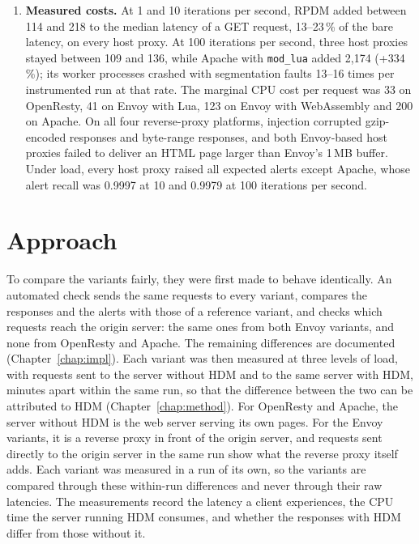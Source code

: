 \documentclass{rptuma}
\begin{document}
\begin{enumerate}
    replicates are taken at 1, 10 and 100 iterations per second (one iteration being nine
    requests), and the probe order follows a Williams design \cite{williams1949designs}. Every
    run is measured on three planes: end-to-end latency from the load generator, CPU time per
    request from the container's control group, and microsecond timers inside the host proxy. Runs
    that fail explicit validity gates are excluded. Separate experiments measure capacity and
    check functional correctness against the bare tier.
  \item \textbf{Measured costs.} At 1 and 10 iterations per second, RPDM added between 114 and
    218\us{} to the median latency of a GET request, 13--23\,\% of the bare latency, on every
    host proxy. At 100 iterations per second, three host proxies stayed between 109 and 136\us, while
    Apache with \texttt{mod\_lua} added 2,174\us{} (+334\,\%); its worker processes crashed with
    segmentation faults 13--16 times per instrumented run at that rate. The marginal CPU cost per
    request was 33\us{} on OpenResty, 41\us{} on Envoy with Lua, 123\us{} on Envoy with
    WebAssembly and 200\us{} on Apache. On all four reverse-proxy platforms, injection corrupted gzip-encoded
    responses and byte-range responses, and both Envoy-based host proxies failed to deliver an HTML page
    larger than Envoy's 1\,MB buffer. Under load, every host proxy raised all expected alerts except
    Apache, whose alert recall was 0.9997 at 10 and 0.9979 at 100 iterations per second.
\end{enumerate}
\fi

\section{Approach}
\label{sec:intro.approach}

To compare the variants fairly, they were first made to behave identically. An automated check
sends the same requests to every variant, compares the responses and the alerts with those of a
reference variant, and checks which requests reach the origin server: the same ones from both
Envoy variants, and none from OpenResty and Apache. The remaining differences are documented
(Chapter~\ref{chap:impl}). Each variant was then measured at three levels of load, with requests sent to
the server without HDM and to the same server with HDM, minutes apart within the same run, so
that the difference between the two can be attributed to HDM (Chapter~\ref{chap:method}). For OpenResty and Apache, the server without HDM is the web server serving its own pages. For the
Envoy variants, it is a reverse proxy in front of the origin server, and requests sent directly to
the origin server in the same run show what the reverse proxy itself adds.
Each variant was measured in a run of its own, so the variants are compared through these
within-run differences and never through their raw latencies. The measurements record the latency
a client experiences, the CPU time the server running HDM consumes, and whether the responses with HDM
differ from those without it.
\end{document}
